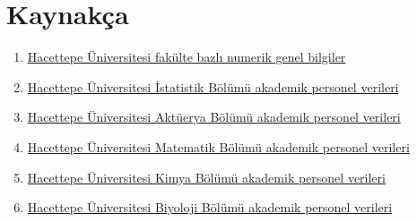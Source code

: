 \documentclass{article}
\begin{document}
\section{Kaynakça}
\begin{enumerate}
    \item \href{https://www.hacettepe.edu.tr/ogretim/sayilarla_ogretim}{Hacettepe Üniversitesi fakülte bazlı numerik genel bilgiler}
    \item \href{https://stat.hacettepe.edu.tr/tr/menu/ogretim_uyeleri-118}{Hacettepe Üniversitesi İstatistik Bölümü akademik personel verileri}
    \item \href{https://aktuerya.hacettepe.edu.tr/pers_ou.php}{Hacettepe Üniversitesi Aktüerya Bölümü akademik personel verileri}
    \item \href{https://mat.hacettepe.edu.tr/akademik_personel.html}{Hacettepe Üniversitesi Matematik Bölümü akademik personel verileri}
    \item \href{https://chem.hacettepe.edu.tr/tr/menu/ogretim_uyeleri-10}{Hacettepe Üniversitesi Kimya Bölümü akademik personel verileri}
    \item \href{https://biology.hacettepe.edu.tr/tr/akademik_personel-226}{Hacettepe Üniversitesi Biyoloji Bölümü akademik personel verileri}
\end{enumerate}
\end{document}
